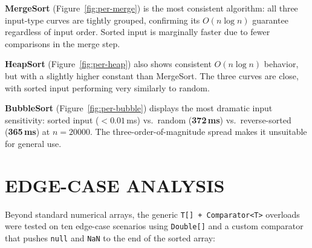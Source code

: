 \documentclass[12pt]{article}
\begin{document}
\textbf{MergeSort} (Figure~\ref{fig:per-merge}) is the most consistent algorithm: all three
input-type curves are tightly grouped, confirming its $O(n \log n)$ guarantee regardless of
input order. Sorted input is marginally faster due to fewer comparisons in the merge step.

\textbf{HeapSort} (Figure~\ref{fig:per-heap}) also shows consistent $O(n \log n)$ behavior,
but with a slightly higher constant than MergeSort. The three curves are close, with sorted
input performing very similarly to random.

\textbf{BubbleSort} (Figure~\ref{fig:per-bubble}) displays the most dramatic input sensitivity:
sorted input ($< 0.01$\,ms) vs.\ random (\textbf{372\,ms}) vs.\ reverse-sorted (\textbf{365\,ms})
at $n = 20000$. The three-order-of-magnitude spread makes it unsuitable for general use.

\section*{EDGE-CASE ANALYSIS}

\hspace{0.8cm} Beyond standard numerical arrays, the generic \texttt{T[] + Comparator<T>}
overloads were tested on ten edge-case scenarios using \texttt{Double[]} and a custom comparator
that pushes \texttt{null} and \texttt{NaN} to the end of the sorted array:
\end{document}
